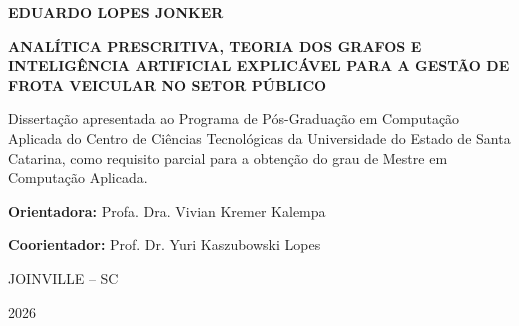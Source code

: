 \begin{folhaderosto}
    \center
    {\ABNTEXchapterfont\bfseries\large EDUARDO LOPES JONKER\par}
    
    \vspace{4.5cm}
    \begin{center}
        {\ABNTEXchapterfont\bfseries\Large ANALÍTICA PRESCRITIVA, TEORIA DOS GRAFOS E INTELIGÊNCIA ARTIFICIAL EXPLICÁVEL PARA A GESTÃO DE FROTA VEICULAR NO SETOR PÚBLICO\par}
    \end{center}
    
    \vspace{2.5cm}
    \hspace{.45\textwidth}
    \begin{minipage}{.5\textwidth}
        \SingleSpacing
        \small
        Dissertação apresentada ao Programa de Pós-Graduação em Computação Aplicada do Centro de Ciências Tecnológicas da Universidade do Estado de Santa Catarina, como requisito parcial para a obtenção do grau de Mestre em Computação Aplicada.\par
        \vspace{0.5cm}
        \textbf{Orientadora:} Profa. Dra. Vivian Kremer Kalempa\par
        \vspace{0.2cm}
        \textbf{Coorientador:} Prof. Dr. Yuri Kaszubowski Lopes
    \end{minipage}
    
    \vfill
    {\large JOINVILLE -- SC\par}
    {\large 2026\par}
\end{folhaderosto}
